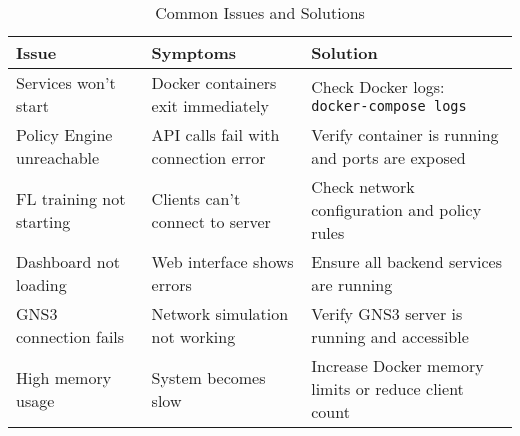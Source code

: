 \documentclass[12pt,a4paper,twoside]{article}
\newcommand{\code}[1]{\texttt{#1}}
\begin{document}
\begin{table}[H]
\centering
\begin{tabular}{@{}p{4cm}p{5cm}p{5cm}@{}}
\toprule
\textbf{Issue} & \textbf{Symptoms} & \textbf{Solution} \\
\midrule
Services won't start & Docker containers exit immediately & Check Docker logs: \code{docker-compose logs} \\
Policy Engine unreachable & API calls fail with connection error & Verify container is running and ports are exposed \\
FL training not starting & Clients can't connect to server & Check network configuration and policy rules \\
Dashboard not loading & Web interface shows errors & Ensure all backend services are running \\
GNS3 connection fails & Network simulation not working & Verify GNS3 server is running and accessible \\
High memory usage & System becomes slow & Increase Docker memory limits or reduce client count \\
\bottomrule
\end{tabular}
\caption{Common Issues and Solutions}
\label{tab:troubleshooting}
\end{table}



\end{document}
